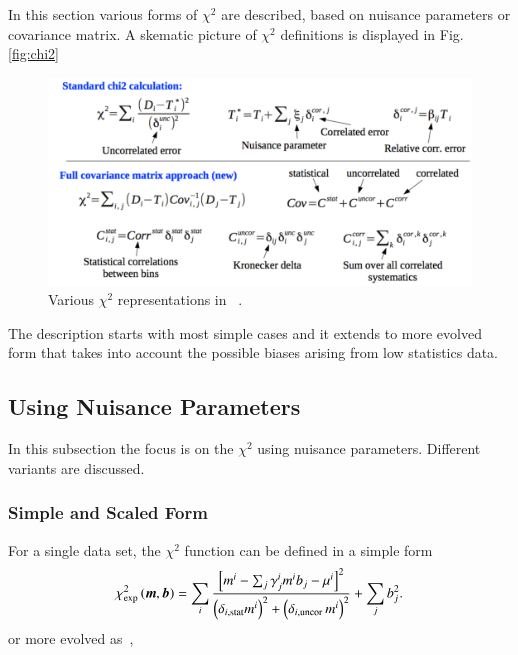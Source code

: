 \label{sec:chi2}
In this section various forms of $\chi^2$ are described, based on nuisance parameters or
covariance matrix.
A skematic picture of $\chi^2$ definitions is displayed in Fig. \ref{fig:chi2}
\begin{figure}
\begin{center}
\caption{Various $\chi^2$ representations in \fitter\ .}
\includegraphics[width=0.75\linewidth]{figures/chi2.pdf}
\end{center}
\label{fig:org}
\end{figure}
 The description starts with most simple cases and it extends to 
 more evolved form that takes into account the
 possible biases arising from low statistics data. 



\subsection{Using Nuisance Parameters}

In this subsection the focus is on the $\chi^2$ using nuisance parameters. Different variants are discussed.



\subsubsection{Simple and Scaled Form}

For a single data set, the $\chi^2$ function can be defined in a simple form 
\begin{equation}
 \chi^2_{\rm exp}\left(\boldsymbol{m},\boldsymbol{b}\right) = %
 \sum_i
 \frac{\left[m^i
- \sum_j \gamma^i_j m^i b_j  - {\mu^i} \right]^2}
{ \textstyle \left(\delta_{i,{\rm stat}}m^i\right)^2 +
\left(\delta_{i,{\rm uncor}}\,  m^i\right)^2}
 + \sum_j b^2_j.
\label{eq:ave}\end{equation}
%
or more evolved as~\cite{H1:2009bp},


